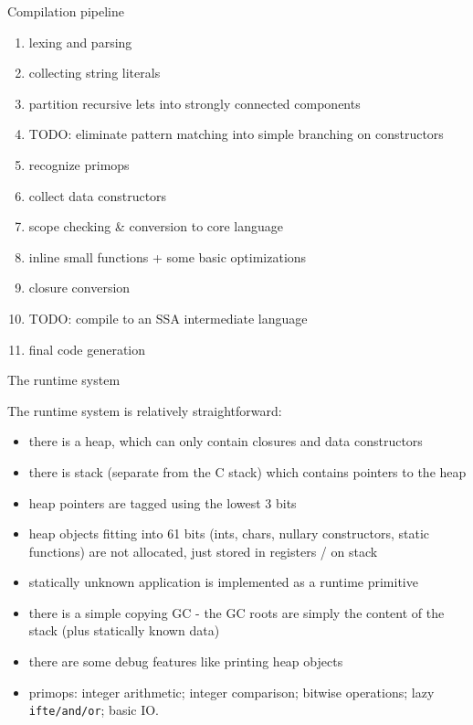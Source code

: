 \documentclass{beamer}
\begin{document}

\begin{frame}{Compilation pipeline}

\begin{enumerate}
\item lexing and parsing
\item collecting string literals
\item partition recursive lets into strongly connected components
\item TODO: eliminate pattern matching into simple branching on constructors
\item recognize primops
\item collect data constructors
\item scope checking \& conversion to core language
\item inline small functions + some basic optimizations
\item closure conversion
\item TODO: compile to an SSA intermediate language
\item final code generation 
\end{enumerate}

\end{frame}


\begin{frame}{The runtime system}

The runtime system is relatively straightforward:

{\small
\begin{itemize}
\item there is a heap, which can only contain closures and data constructors
\item there is stack (separate from the C stack) which contains pointers to the heap
\item heap pointers are tagged using the lowest 3 bits
\item heap objects fitting into 61 bits (ints, chars, nullary constructors, static functions) are
      not allocated, just stored in registers / on stack
\item statically unknown application is implemented as a runtime primitive 
\item there is a simple copying GC - the GC roots are simply the content of the stack
      (plus statically known data)
\item there are some debug features like printing heap objects
\item primops: integer arithmetic; integer comparison; bitwise operations; lazy {\tt ifte/and/or}; basic IO.
\end{itemize}
}

\end{frame}
\end{document}

